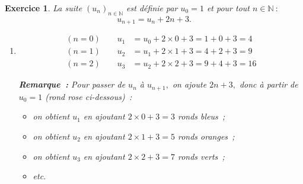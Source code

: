 \documentclass[10pt]{article}
\newtheorem{exo}{Exercice}
\begin{document}
\begin{exo}


La suite $(u_n)_{n\in\mathbb{N}}$ est définie par $u_0=1$ et pour tout $n\in\mathbb{N}~:$ \[u_{n+1}=u_n+2n+3.\]

\begin{enumerate}
\item \begin{align*}
(n=0)\qquad u_{1}&=u_0+2\times 0+3=1+0+3=4\\
(n=1)\qquad u_{2}&=u_1+2\times 1+3=4+2+3=9\\
(n=2)\qquad u_{3}&=u_2+2\times 2+3=9+4+3=16
\end{align*}

\medskip

\textbf{Remarque~:} Pour passer de $u_n$ à $u_{n+1},$ on ajoute $2n+3,$ donc à partir de $u_0=1$ (rond rose ci-dessous)~:

\begin{itemize}
\item[\textbullet] on obtient $u_1$ en ajoutant $2\times 0+3=3$ ronds bleus~;
\item[\textbullet] on obtient $u_2$ en ajoutant $2\times 1+3=5$ ronds oranges~;
\item[\textbullet] on obtient $u_3$ en ajoutant $2\times 2+3=7$ ronds verts~;
\item[\textbullet] etc.
\end{itemize}

\medskip


\end{enumerate}
\end{exo}
\end{document}
